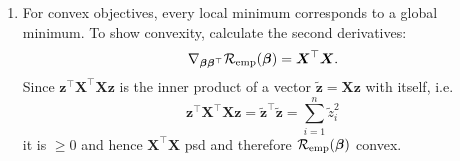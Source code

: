 \documentclass[a4paper]{article}
\begin{document}
{\begin{enumerate}
\begin{itemize}
$$  $$
  \item Optimization = minimization of the empirical risk can either be done analytically (the preferred solution in this case!) or using, e.g., gradient descent.
  $$
  \nabla_{\bm{\beta}} \riske(\bm{\beta}) = 0.5 \nabla_{\bm{\beta}} (\bm{y}-\bm{X\beta})^\top(\bm{y}-\bm{X\beta}) = -\bm{X}^\top (\bm{y} - \bm{X}\bm{\beta})
  $$
  \end{itemize}
  \item For convex objectives, every local minimum corresponds to a global minimum. To show convexity, calculate the second derivatives:
  $$
  \nabla_{\bm{\beta}\bm{\beta}^\top}  \mathcal{R}_{\text{emp}}(\bm{\beta}) = \bm{X}^\top\bm{X}.
  $$
  Since $\bm{z}^\top \bm{X}^\top \bm{X} \bm{z}$ is the inner product of a vector $\tilde{\bm{z}} = \bm{X} \bm{z}$ with itself, i.e. 
  $$
  \bm{z}^\top \bm{X}^\top \bm{X} \bm{z} = \tilde{\bm{z}}^\top \tilde{\bm{z}} = \sum_{i=1}^n \tilde{z}_i^2
  $$
  it is $\geq 0$ and hence $\bm{X}^\top \bm{X}$ psd and therefore $\mathcal{R}_{\text{emp}}(\bm{\beta})$ convex.
\end{enumerate}
}
\end{document}
